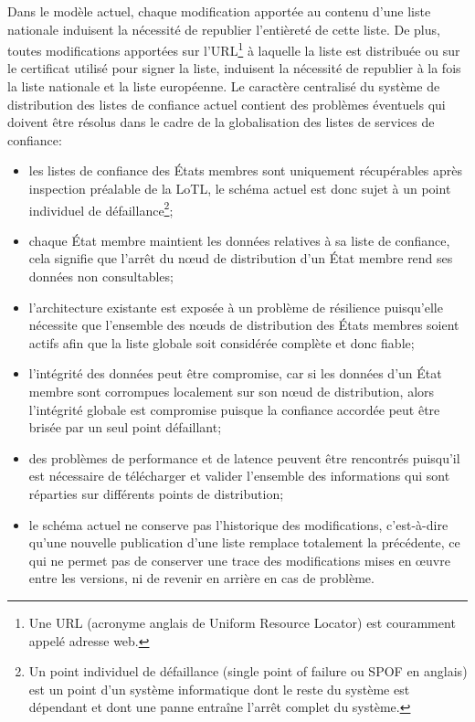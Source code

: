 \documentclass{tnreport}
\begin{document}
Dans le modèle actuel, chaque modification apportée au contenu d'une liste nationale induisent la nécessité de republier l'entièreté de cette liste. De plus, toutes modifications apportées sur l'URL\footnote{Une URL (acronyme anglais de Uniform Resource Locator) est couramment appelé adresse web.} à laquelle la liste est distribuée ou sur le certificat utilisé pour signer la liste, induisent la nécessité de republier à la fois la liste nationale et la liste européenne.
Le caractère centralisé du système de distribution des listes de confiance actuel contient des 
problèmes éventuels qui doivent être résolus dans le cadre de la globalisation des listes de services de confiance:
\begin{itemize}
	\item les listes de confiance des États membres sont uniquement récupérables après inspection préalable de la LoTL, le schéma actuel est donc sujet à un point individuel de défaillance\footnote{Un point individuel de défaillance (single point of failure ou SPOF en anglais) est un point d'un système informatique dont le reste du système est dépendant et dont une panne entraîne l'arrêt complet du système.};
	\item chaque État membre maintient les données relatives à sa liste de confiance, cela signifie que l'arrêt du nœud de distribution d'un État membre rend ses données non consultables;
	\item l'architecture existante est exposée à un problème de résilience puisqu'elle nécessite que l'ensemble des nœuds de distribution des États membres soient actifs afin que la liste globale soit considérée complète et donc fiable;
	\item l'intégrité des données peut être compromise, car si les données d'un État membre sont corrompues localement sur son nœud de distribution, alors l'intégrité globale est compromise puisque la confiance accordée peut être brisée par un seul point défaillant;
	\item des problèmes de performance et de latence peuvent être rencontrés puisqu'il est nécessaire de télécharger et valider l'ensemble des informations qui sont réparties sur différents points de distribution;
	\item le schéma actuel ne conserve pas l'historique des modifications, c'est-à-dire qu'une nouvelle publication d'une liste remplace totalement la précédente, ce qui ne permet pas de conserver une trace des modifications mises en œuvre entre les versions, ni de revenir en arrière en cas de problème.
	\newline
\end{itemize}
\end{document}
